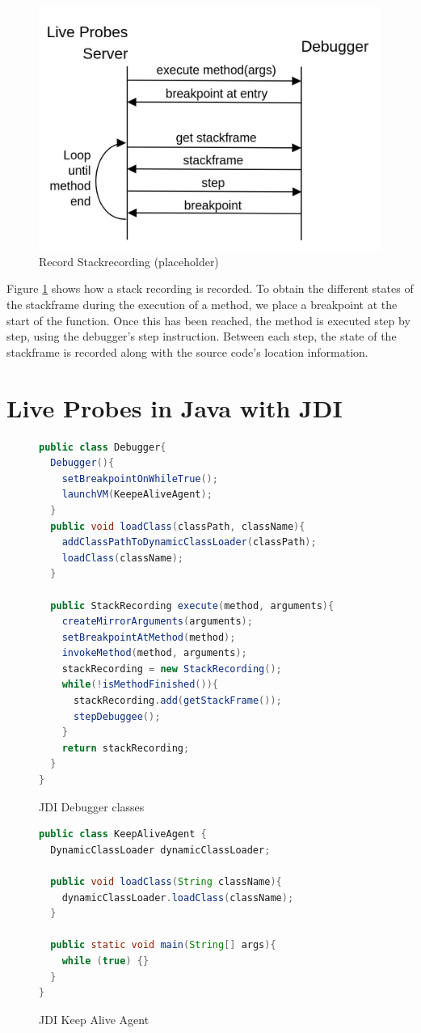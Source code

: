 \documentclass[english,submission]{programming}
\begin{document}
\begin{figure}[h]
  \centering
  \includegraphics[width=0.6\linewidth]{img/stackrecording_impl.png}
  \caption{Record Stackrecording (placeholder)}
  \label{fig:stack-recording-impl}
\end{figure}

Figure \ref{fig:stack-recording-impl} shows how a stack recording is recorded.
To obtain the different states of the stackframe during the execution of a method, we place a breakpoint at the start of the function. 
Once this has been reached, the method is executed step by step, using the debugger's step instruction. 
Between each step, the state of the stackframe is recorded along with the source code's location information.


\section{Live Probes in Java with JDI}
\label{sec:live-probes-java}
\begin{figure}[htbp]
  \centering
  \begin{lstlisting}[language=Java]
public class Debugger{
  Debugger(){
    setBreakpointOnWhileTrue();
    launchVM(KeepeAliveAgent);
  }
  public void loadClass(classPath, className){
    addClassPathToDynamicClassLoader(classPath);
    loadClass(className);
  }

  public StackRecording execute(method, arguments){
    createMirrorArguments(arguments);
    setBreakpointAtMethod(method);
    invokeMethod(method, arguments);
    stackRecording = new StackRecording();
    while(!isMethodFinished()){
      stackRecording.add(getStackFrame());
      stepDebuggee();
    }
    return stackRecording;
  }
}
  \end{lstlisting}
  \caption{JDI Debugger classes}
  \label{fig:debugger-class}
\end{figure}

\begin{figure}[htbp]
  \centering
  \begin{lstlisting}[language=Java]
public class KeepAliveAgent {
  DynamicClassLoader dynamicClassLoader;

  public void loadClass(String className){
    dynamicClassLoader.loadClass(className);
  }

  public static void main(String[] args){
    while (true) {}
  }
}
  \end{lstlisting}
  \caption{JDI Keep Alive Agent}
  \label{fig:java-keep-alive-agent}
\end{figure}
\end{document}
